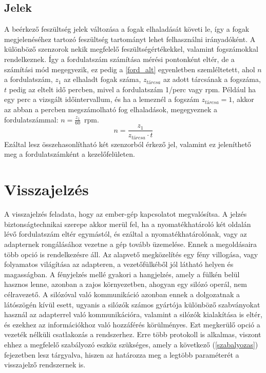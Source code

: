 \subsection{Jelek}
\label{jelek}

A beérkező feszültség jelek változása a fogak elhaladását követi le, így a fogak megjelenéséhez tartozó feszültség tartományt lehet felhasználni irányadóként. A különböző szenzorok nekik megfelelő feszültségértékekkel, valamint fogszámokkal rendelkeznek. Így a fordulatszám számítása mérési pontonként eltér, de a számítási mód megegyezik, ez pedig a \ref{ford_alt} egyenletben szemléltetett, ahol $n$ a fordulatszám, $z_1$ az elhaladt fogak száma, $z_{tárcsa}$ az adott tárcsának a fogszáma, $t$ pedig az eltelt idő percben, mivel a fordulatszám 1/perc vagy rpm. Például ha egy perc a vizsgált időintervallum, és ha a lemeznél a fogszám $z_{tárcsa}=1$, akkor az abban a percben megszámolható fog elhaladások, megegyeznek a fordulatszámmal: $n = \frac{z_1}{60}$~rpm.
\begin{equation}
	n = \frac{z_1}{z_{tárcsa}\cdot t}
	\label{ford_alt}
\end{equation}
Ezáltal lesz összehasonlítható két szenzorból érkező jel, valamint ez jeleníthető meg a fordulatszámként a kezelőfelületen.

\section{Visszajelzés}
\label{visszajelz}

A visszajelzés feladata, hogy az ember-gép kapcsolatot megvalósítsa. A jelzés biztonságtechnikai szerepe akkor merül fel, ha a nyomatékhatároló két oldalán lévő fordulatszám eltér egymástól, és ezáltal a nyomatékhatárolónak, vagy az adapternek rongálásához vezetne a gép tovább üzemelése. Ennek a megoldásaira több opció is rendelkezésre áll. Az alapvető megközelítés egy fény villogása, vagy folyamatos világítása az adapteren, a vezetőfülkéből jól látható helyen és magasságban. A fényjelzés mellé gyakori a hangjelzés, amely a fülkén belül hasznos lenne, azonban a zajos környezetben, ahogyan egy silózó operál, nem célravezető. A silózóval való kommunikáció azonban ennek a dolgozatnak a látószögén kívül esett, ugyanis a silózók számos gyártója különböző szabványokat használ az adapterrel való kommunikációra, valamint a silózók kialakítása is eltér, és ezekhez az információkhoz való hozzáférés körülményes. Ezt megkerülő opció a vezeték nélküli csatlakozás a rendszerhez. Erre több protokoll is alkalmas, viszont ehhez a megfelelő szabályozó eszköz szükséges, amely a következő (\ref{szabalyozas}) fejezetben lesz tárgyalva, hiszen az határozza meg a legtöbb paraméterét a visszajelző rendszernek is.


